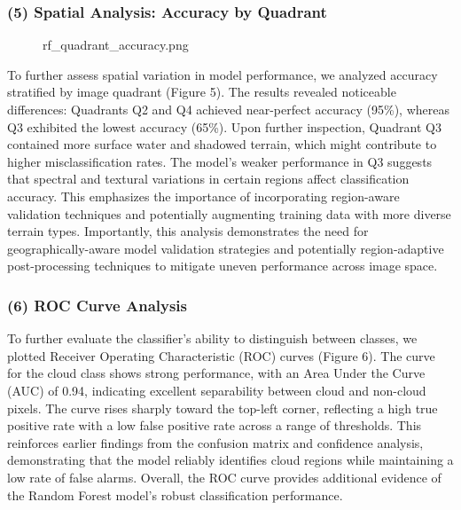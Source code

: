 \documentclass[11pt]{article}
\begin{document}
\subsubsection*{(5) Spatial Analysis: Accuracy by
Quadrant}\label{spatial-analysis-accuracy-by-quadrant}

\begin{figure}
\centering
{}
\caption{rf\_quadrant\_accuracy.png}
\end{figure}

To further assess spatial variation in model performance, we analyzed
accuracy stratified by image quadrant (Figure 5). The results revealed
noticeable differences: Quadrants Q2 and Q4 achieved near-perfect
accuracy (95\%), whereas Q3 exhibited the lowest accuracy (65\%). Upon
further inspection, Quadrant Q3 contained more surface water and
shadowed terrain, which might contribute to higher misclassification
rates. The model's weaker performance in Q3 suggests that spectral and
textural variations in certain regions affect classification accuracy.
This emphasizes the importance of incorporating region-aware validation
techniques and potentially augmenting training data with more diverse
terrain types. Importantly, this analysis demonstrates the need for
geographically-aware model validation strategies and potentially
region-adaptive post-processing techniques to mitigate uneven
performance across image space.

\subsubsection*{(6) ROC Curve Analysis}\label{roc-curve-analysis}

To further evaluate the classifier's ability to distinguish between
classes, we plotted Receiver Operating Characteristic (ROC) curves
(Figure 6). The curve for the cloud class shows strong performance, with
an Area Under the Curve (AUC) of 0.94, indicating excellent separability
between cloud and non-cloud pixels. The curve rises sharply toward the
top-left corner, reflecting a high true positive rate with a low false
positive rate across a range of thresholds. This reinforces earlier
findings from the confusion matrix and confidence analysis,
demonstrating that the model reliably identifies cloud regions while
maintaining a low rate of false alarms. Overall, the ROC curve provides
additional evidence of the Random Forest model's robust classification
performance.
\end{document}
